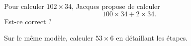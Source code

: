 
\begin{exercice}\label{exosmath-0741}

    Pour calculer \( 102\times 34\), Jacques propose de calculer
    \begin{equation}
        100\times 34+2\times 34.
    \end{equation}
    Est-ce correct ?

    Sur le même modèle, calculer \( 53\times 6\) en détaillant les étapes.

\end{exercice}
